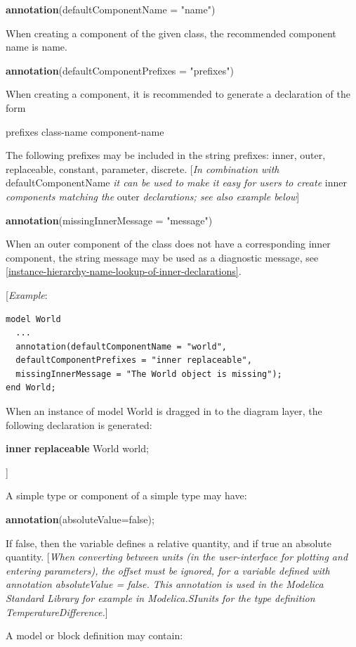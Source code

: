 \documentclass[10pt,a4paper]{report}
\begin{document}
\textbf{annotation}(defaultComponentName = "name")

When creating a component of the given class, the recommended component
name is name.

\textbf{annotation}(defaultComponentPrefixes = "prefixes")

When creating a component, it is recommended to generate a declaration
of the form

prefixes class-name component-name

The following prefixes may be included in the string prefixes: inner,
outer, replaceable, constant, parameter, discrete. {[}\emph{In
combination with} defaultComponentName \emph{it can be used to make it
easy for users to create} inner \emph{components matching the} outer
\emph{declarations; see also example below}{]}

\textbf{annotation}(missingInnerMessage = "message")

When an outer component of the class does not have a corresponding inner
component, the string message may be used as a diagnostic message, see
\ref{instance-hierarchy-name-lookup-of-inner-declarations}.

{[}\emph{Example}:

\begin{lstlisting}[language=modelica]
model World
  ...
  annotation(defaultComponentName = "world",
  defaultComponentPrefixes = "inner replaceable",
  missingInnerMessage = "The World object is missing");
end World;
\end{lstlisting}
When an instance of model World is dragged in to the diagram layer, the
following declaration is generated:

\textbf{inner} \textbf{replaceable} World world;

{]}

A simple type or component of a simple type may have:

\textbf{annotation}(absoluteValue=false);

If false, then the variable defines a relative quantity, and if true an
absolute quantity. {[}\emph{When converting between units (in the
user-interface for plotting and entering parameters), the offset must be
ignored, for a variable defined with annotation absoluteValue = false.
This annotation is used in the Modelica Standard Library for example in
Modelica.SIunits for the type definition TemperatureDifference.}{]}

A model or block definition may contain:
\end{document}
